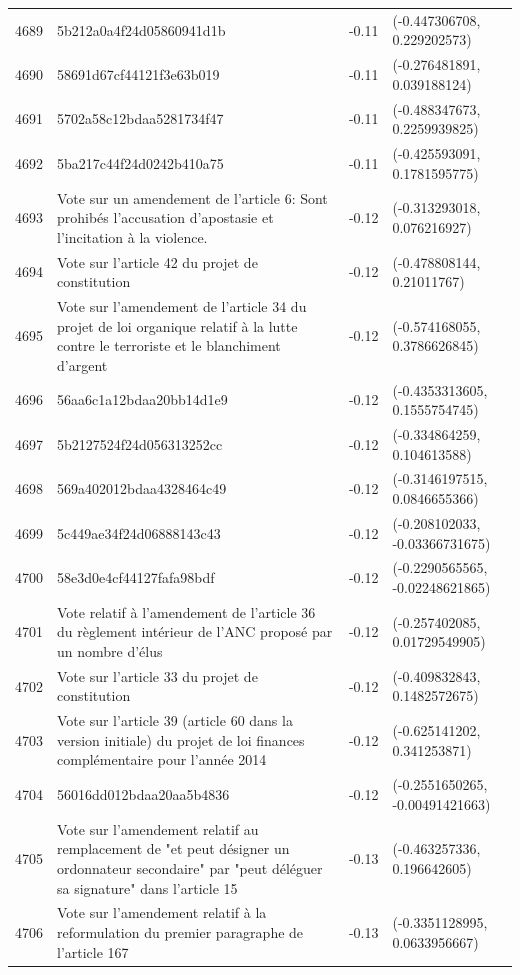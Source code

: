 \begin{table}[ht]
\begin{tabular}{rlrl}
  4689 & 5b212a0a4f24d05860941d1b & -0.11 & (-0.447306708, 0.229202573) \\ 
  4690 & 58691d67cf44121f3e63b019 & -0.11 & (-0.276481891, 0.039188124) \\ 
  4691 & 5702a58c12bdaa5281734f47 & -0.11 & (-0.488347673, 0.2259939825) \\ 
  4692 & 5ba217c44f24d0242b410a75 & -0.11 & (-0.425593091, 0.1781595775) \\ 
  4693 & Vote sur un amendement de l'article 6: Sont prohibés l'accusation d'apostasie et l'incitation à la violence. & -0.12 & (-0.313293018, 0.076216927) \\ 
  4694 & Vote sur l'article 42 du projet de constitution & -0.12 & (-0.478808144, 0.21011767) \\ 
  4695 & Vote sur l'amendement de l'article 34 du projet de loi organique relatif à la lutte contre le terroriste et le blanchiment d'argent & -0.12 & (-0.574168055, 0.3786626845) \\ 
  4696 & 56aa6c1a12bdaa20bb14d1e9 & -0.12 & (-0.4353313605, 0.1555754745) \\ 
  4697 & 5b2127524f24d056313252cc & -0.12 & (-0.334864259, 0.104613588) \\ 
  4698 & 569a402012bdaa4328464c49 & -0.12 & (-0.3146197515, 0.0846655366) \\ 
  4699 & 5c449ae34f24d06888143c43 & -0.12 & (-0.208102033, -0.03366731675) \\ 
  4700 & 58e3d0e4cf44127fafa98bdf & -0.12 & (-0.2290565565, -0.02248621865) \\ 
  4701 & Vote relatif à l'amendement de l'article 36 du règlement intérieur de l'ANC proposé par un nombre d'élus & -0.12 & (-0.257402085, 0.01729549905) \\ 
  4702 & Vote sur l'article 33 du projet de constitution & -0.12 & (-0.409832843, 0.1482572675) \\ 
  4703 & Vote sur l'article 39 (article 60 dans la version initiale) du projet de loi finances complémentaire pour l'année 2014 & -0.12 & (-0.625141202, 0.341253871) \\ 
  4704 & 56016dd012bdaa20aa5b4836 & -0.12 & (-0.2551650265, -0.00491421663) \\ 
  4705 & Vote sur l'amendement relatif au remplacement de "et peut désigner un ordonnateur secondaire" par "peut  déléguer sa signature" dans l'article 15 & -0.13 & (-0.463257336, 0.196642605) \\ 
  4706 & Vote sur l'amendement relatif à la reformulation du premier paragraphe de l'article 167 & -0.13 & (-0.3351128995, 0.0633956667) \\ 

\end{tabular}
\end{table}
